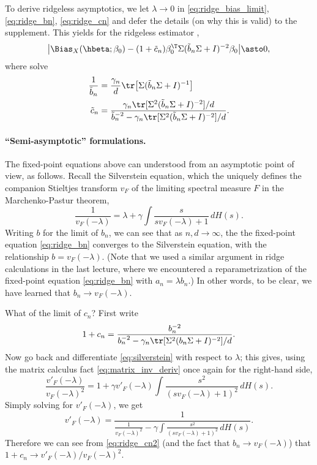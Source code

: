 \documentclass{article}
\begin{document}
To derive ridgeless asymptotics, we let $\lambda \to 0$ in
\eqref{eq:ridge_bias_limit}, \eqref{eq:ridge_bn}, \eqref{eq:ridge_cn} and defer
the details (on why this is valid) to the supplement. This yields for the
ridgeless estimator ,
\begin{equation}
\label{eq:ridgeless_bias_limit}
\big| \Bias_X(\hbeta; \beta_0) - (1+\tilde{c}_n) \beta_0^\T \Sigma (\tilde{b}_n
\Sigma + I)^{-2} \beta_0 \big| \asto 0,  
\end{equation}
where  solve
\begin{align}
\label{eq:ridgeless_bn}
\frac{1}{\tilde{b}_n} &= \frac{\gamma_n}{d} \tr \big[ \Sigma (\tilde{b}_n \Sigma
  + I)^{-1} \big]\\  
\label{eq:ridgeless_cn}
\tilde{c}_n &= \frac{\gamma_n \tr [ \Sigma^2 (\tilde{b}_n \Sigma + I)^{-2} ] /
  d}{\tilde{b}_n^{-2} - \gamma_n \tr [ \Sigma^2 (\tilde{b}_n \Sigma + I)^{-2} ]
  / d}. 
\end{align}

\paragraph{``Semi-asymptotic'' formulations.} 

The fixed-point equations above can understood from an asymptotic point of view, 
as follows. Recall the Silverstein equation, which the uniquely defines the
companion Stieltjes transform $v_F$ of the limiting spectral measure $F$ in the
Marchenko-Pastur theorem,  
\begin{equation}
\label{eq:silverstein}
\frac{1}{v_F(-\lambda)} = \lambda + \gamma \int \frac{s}{s v_F(-\lambda) + 1} \,
dH(s).  
\end{equation}
Writing $b$ for the limit of $b_n$, we can see that as $n,d \to \infty$, the the
fixed-point equation \eqref{eq:ridge_bn} converges to the Silverstein equation,
with the relationship $b = v_F(-\lambda)$. (Note that we used a similar argument
in ridge calculations in the last lecture, where we encountered a
reparametrization of the fixed-point equation \eqref{eq:ridge_bn} with $a_n =
\lambda b_n$.) In other words, to be clear, we have learned that $b_n \to
v_F(-\lambda)$.

What of the limit of $c_n$? First write
\begin{equation}
\label{eq:ridge_cn2}
1 + c_n = \frac{b_n^{-2}}{b_n^{-2} - \gamma_n \tr [ \Sigma^2 (b_n \Sigma +
  I)^{-2} ] / d}. 
\end{equation}
Now go back and differentiate \eqref{eq:silverstein} with respect to $\lambda$; 
this gives, using the matrix calculus fact \eqref{eq:matrix_inv_deriv} once
again for the right-hand side,
\[
\frac{v'_F(-\lambda)}{v_F(-\lambda)^2} = 1 + \gamma v'_F(-\lambda) \int
\frac{s^2}{(s v_F(-\lambda) + 1)^2} \, dH(s).
\]
Simply solving for $v'_F(-\lambda)$, we get 
\[
v'_F(-\lambda) = \frac{1}{\frac{1}{v_F(-\lambda)^2} - \gamma \int \frac{s^2}{(s 
    v_F(-\lambda) + 1)^2} \, dH(s)}. 
\]
Therefore we can see from \eqref{eq:ridge_cn2} (and the fact that $b_n \to
v_F(-\lambda)$) that $1+c_n \to v'_F(-\lambda) / v_F(-\lambda)^2$. 
\end{document}
